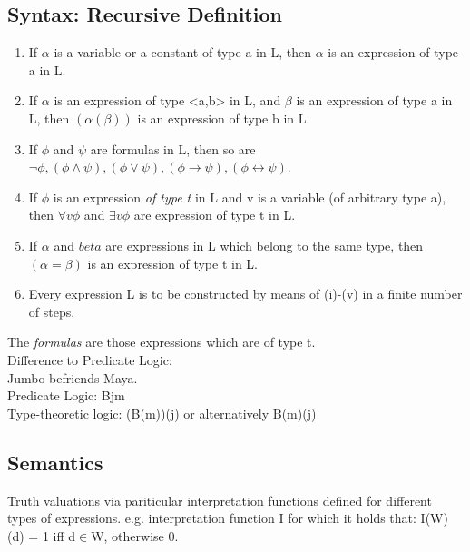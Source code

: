 \subsection*{Syntax: Recursive Definition}
\begin{enumerate}
\item If $\alpha$ is a variable or a constant of type a in L, then $\alpha$ is an expression of type a in L.
\item If $\alpha$ is an expression of type <a,b> in L, and $\beta$ is an expression of type a in L, then $(\alpha (\beta))$ is an expression of type b in L.
\item If $\phi$ and $\psi$ are formulas in L, then so are $\neg \phi, (\phi \land \psi), (\phi \lor \psi), (\phi \to \psi), (\phi \leftrightarrow \psi)$.
\item If $\phi$ is an expression \emph{of type t} in L and v is a variable (of arbitrary type a), then $\forall v \phi$ and $\exists v \phi$ are expression of type t in L.
\item If $\alpha$ and $beta$ are expressions in L which belong to the same type, then $(\alpha = \beta)$ is an expression of type t in L.
\item Every expression L is to be constructed by means of (i)-(v) in a finite number of steps.
\end{enumerate}

The \emph{formulas} are those expressions which are of type t. \\

Difference to Predicate Logic: \\
Jumbo befriends Maya. \\
Predicate Logic: Bjm \\
Type-theoretic logic: (B(m))(j) or alternatively B(m)(j) 

\subsection*{Semantics}
Truth valuations via pariticular interpretation functions defined for different types of expressions. e.g. interpretation function I for which it holds that: I(W)(d) = 1 iff d$\in$W, otherwise 0. 